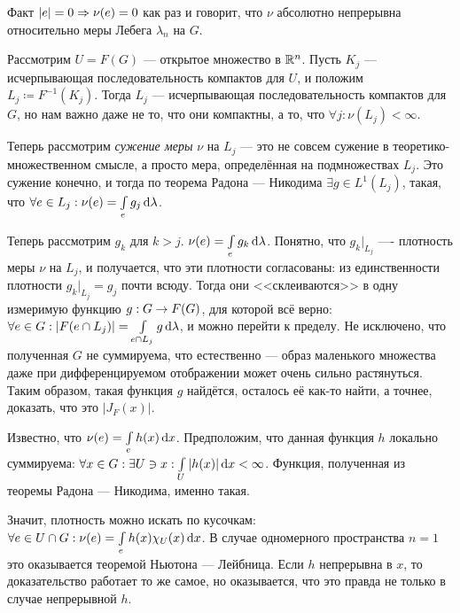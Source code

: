 \documentclass[a4paper]{report}
\begin{document}
    Факт $|e| = 0 \Rightarrow \nu(e) = 0$ как раз и говорит, что $\nu$ абсолютно непрерывна относительно меры Лебега $\lambda_n$ на $G$.

    Рассмотрим $U = F(G)$ --- открытое множество в $\mathbb{R}^n$. Пусть $K_j$ --- исчерпывающая последовательность компактов для $U$, и положим $L_j \coloneqq F^{-1}(K_j)$.
    Тогда $L_j$ --- исчерпывающая последовательность компактов для $G$, но нам важно даже не то, что они компактны, а то, что $\forall j: \nu(L_j) < \infty$.

    Теперь рассмотрим \emph{сужение меры} $\nu$ на $L_j$ --- это не совсем сужение в теоретико-множественном смысле, а просто мера, определённая на подмножествах $L_j$.
    Это сужение конечно, и тогда по теорема Радона --- Никодима $\exists g \in L^1(L_j)$, такая, что $\forall e \in L_j: \nu(e) = \int\limits_{e}g_j\operatorname{d}\!\lambda$.

    Теперь рассмотрим $g_k$ для $k > j$. $\nu(e) = \int\limits_{e}g_k\operatorname{d}\!\lambda$.
    Понятно, что $g_k\big|_{L_j}$ ---- плотность меры $\nu$ на $L_j$, и получается, что эти плотности согласованы: из единственности плотности $g_k\big|_{L_j} = g_j$ почти всюду.
    Тогда они <<склеиваются>> в одну измеримую функцию $g: G \rightarrow F(G)$, для которой всё верно: $\forall e \in G: |F(e \cap L_j)| = \int\limits_{e \cap L_j}g \operatorname{d}\!\lambda$, и можно перейти к пределу.
    Не исключено, что полученная $G$ не суммируема, что естественно --- образ маленького множества даже при дифференцируемом отображении может очень сильно растянуться.
    Таким образом, такая функция $g$ найдётся, осталось её как-то найти, а точнее, доказать, что это $|J_F(x)|$.

    Известно, что $\nu(e) = \int\limits_{e}h(x)\operatorname{d}\! x$.
    Предположим, что данная функция $h$ локально суммируема: $\forall x \in G: \exists U \ni x: \int\limits_{U}|h(x)|\operatorname{d}\! x < \infty$.
    Функция, полученная из теоремы Радона --- Никодима, именно такая.

    Значит, плотность можно искать по кусочкам: $\forall e \in U \cap G: \nu(e) = \int\limits_{e}h(x)\chi_U(x)\operatorname{d}\! x$.
    В случае одномерного пространства $n = 1$ это оказывается теоремой Ньютона --- Лейбница.
    Если $h$ непрерывна в $x$, то доказательство работает то же самое, но оказывается, что это правда не только в случае непрерывной $h$.
\end{document}
